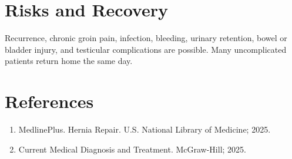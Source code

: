 \section*{Risks and Recovery}
Recurrence, chronic groin pain, infection, bleeding, urinary retention, bowel or bladder injury, and testicular complications are possible. Many uncomplicated patients return home the same day.
\section*{References}
\begin{enumerate}\item MedlinePlus. Hernia Repair. U.S. National Library of Medicine; 2025.\item Current Medical Diagnosis and Treatment. McGraw-Hill; 2025.\end{enumerate}
\clearpage
